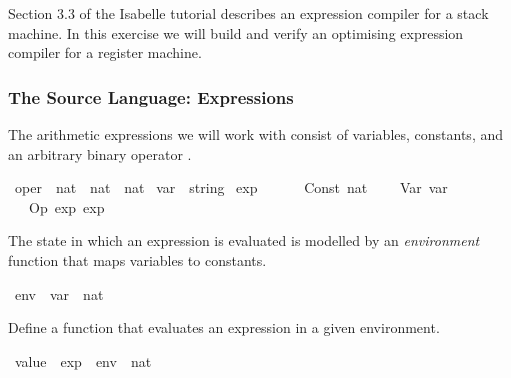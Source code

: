 %
\begin{isabellebody}%
\def\isabellecontext{a{\isadigit{6}}}%
\isamarkupfalse%
%
\isamarkuptrue%
%
\begin{isamarkuptext}%
Section 3.3 of the Isabelle tutorial describes an expression compiler for a stack machine. In this exercise we will build and verify an optimising expression compiler for a register machine.%
\end{isamarkuptext}%
\isamarkuptrue%
%
\begin{isamarkuptext}%
\subsubsection*{The Source Language: Expressions}%
\end{isamarkuptext}%
\isamarkuptrue%
%
\begin{isamarkuptext}%
The arithmetic expressions we will work with consist of variables, constants, and an arbitrary binary operator .%
\end{isamarkuptext}%
\isamarkuptrue%
\ oper\ {\isacharcolon}{\isacharcolon}\ {\isachardoublequote}nat\ {\isasymRightarrow}\ nat\ {\isasymRightarrow}\ nat{\isachardoublequote}\isanewline
\isanewline
\isamarkupfalse%
\ var\ {\isacharequal}\ string\isanewline
\isanewline
\isamarkupfalse%
\ exp\ {\isacharequal}\ \isanewline
\ \ \ \ Const\ nat\ \isanewline
\ \ {\isacharbar}\ Var\ var\isanewline
\ \ {\isacharbar}\ Op\ exp\ exp\isamarkupfalse%
%
\begin{isamarkuptext}%
The state in which an expression is evaluated is modelled by an {\em environment} function that maps variables to constants.%
\end{isamarkuptext}%
\isamarkuptrue%
\ env\ {\isacharequal}\ {\isachardoublequote}var\ {\isasymRightarrow}\ nat{\isachardoublequote}\isamarkupfalse%
%
\begin{isamarkuptext}%
Define a function  that evaluates an expression in a given environment.%
\end{isamarkuptext}%
\isamarkuptrue%
\ value\ {\isacharcolon}{\isacharcolon}\ {\isachardoublequote}exp\ {\isasymRightarrow}\ env\ {\isasymRightarrow}\ nat{\isachardoublequote}\isamarkupfalse%
%
\begin{isamarkuptext}%

\end{isamarkuptext}
\end{isabellebody}
